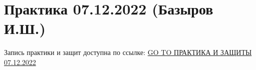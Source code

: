\documentclass[main.tex]{subfiles}
\begin{document}

\section{Практика 07.12.2022 (Базыров И.Ш.)}

Запись практики и защит доступна по ссылке: \href{https://disk.yandex.ru/d/HeQUisnwV0K5EQ/\%D0\%92\%D1\%82\%D0\%BE\%D1\%80\%D0\%BE\%D0\%B9\%20\%D0\%BA\%D1\%83\%D1\%80\%D1\%81\%20\%D0\%BC\%D0\%B0\%D0\%B3\%D0\%B8\%D1\%81\%D1\%82\%D1\%80\%D0\%B0\%D1\%82\%D1\%83\%D1\%80\%D1\%8B/\%D0\%93\%D0\%B8\%D0\%B4\%D1\%80\%D0\%BE\%D0\%B4\%D0\%B8\%D0\%BD\%D0\%B0\%D0\%BC\%D0\%B8\%D1\%87\%D0\%B5\%D1\%81\%D0\%BA\%D0\%BE\%D0\%B5\%20\%D0\%BC\%D0\%BE\%D0\%B4\%D0\%B5\%D0\%BB\%D0\%B8\%D1\%80\%D0\%BE\%D0\%B2\%D0\%B0\%D0\%BD\%D0\%B8\%D0\%B5/2022_12_07_\%D0\%93\%D0\%94\%D0\%9C_\%D0\%BF\%D1\%80\%D0\%B0\%D0\%BA\%D1\%82\%D0\%B8\%D0\%BA\%D0\%B09_\%D0\%B8_\%D0\%B7\%D0\%B0\%D1\%89\%D0\%B8\%D1\%82\%D1\%8B7.mp4}{GO TO ПРАКТИКА И ЗАЩИТЫ 07.12.2022}
\end{document}
